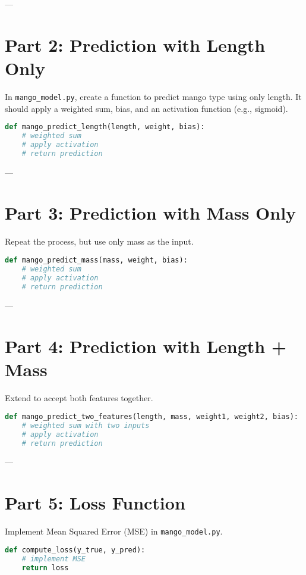 \documentclass[12pt]{article}
\begin{document}
---

\section*{Part 2: Prediction with Length Only}
In \texttt{mango\_model.py}, create a function to predict mango type using only length.  
It should apply a weighted sum, bias, and an activation function (e.g., sigmoid).

\begin{lstlisting}[language=Python]
def mango_predict_length(length, weight, bias):
    # weighted sum
    # apply activation
    # return prediction
\end{lstlisting}

---

\section*{Part 3: Prediction with Mass Only}
Repeat the process, but use only mass as the input.

\begin{lstlisting}[language=Python]
def mango_predict_mass(mass, weight, bias):
    # weighted sum
    # apply activation
    # return prediction
\end{lstlisting}

---

\section*{Part 4: Prediction with Length + Mass}
Extend to accept both features together.

\begin{lstlisting}[language=Python]
def mango_predict_two_features(length, mass, weight1, weight2, bias):
    # weighted sum with two inputs
    # apply activation
    # return prediction
\end{lstlisting}

---

\section*{Part 5: Loss Function}
Implement Mean Squared Error (MSE) in \texttt{mango\_model.py}.

\begin{lstlisting}[language=Python]
def compute_loss(y_true, y_pred):
    # implement MSE
    return loss
\end{lstlisting}
\end{document}
